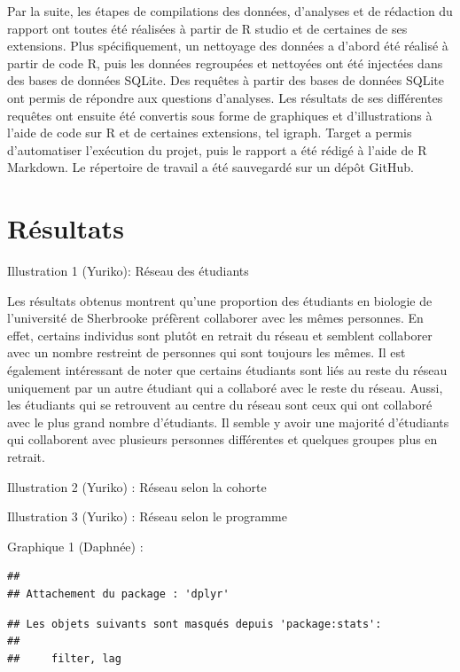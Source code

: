 \documentclass[9pt,twocolumn,twoside,]{pnas-new}
\begin{document}
Par la suite, les étapes de compilations des données, d'analyses et de
rédaction du rapport ont toutes été réalisées à partir de R studio et de
certaines de ses extensions. Plus spécifiquement, un nettoyage des
données a d'abord été réalisé à partir de code R, puis les données
regroupées et nettoyées ont été injectées dans des bases de données
SQLite. Des requêtes à partir des bases de données SQLite ont permis de
répondre aux questions d'analyses. Les résultats de ses différentes
requêtes ont ensuite été convertis sous forme de graphiques et
d'illustrations à l'aide de code sur R et de certaines extensions, tel
igraph. Target a permis d'automatiser l'exécution du projet, puis le
rapport a été rédigé à l'aide de R Markdown. Le répertoire de travail a
été sauvegardé sur un dépôt GitHub.

\hypertarget{ruxe9sultats}{%
\section{Résultats}\label{ruxe9sultats}}

Illustration 1 (Yuriko): Réseau des étudiants

Les résultats obtenus montrent qu'une proportion des étudiants en
biologie de l'université de Sherbrooke préfèrent collaborer avec les
mêmes personnes. En effet, certains individus sont plutôt en retrait du
réseau et semblent collaborer avec un nombre restreint de personnes qui
sont toujours les mêmes. Il est également intéressant de noter que
certains étudiants sont liés au reste du réseau uniquement par un autre
étudiant qui a collaboré avec le reste du réseau. Aussi, les étudiants
qui se retrouvent au centre du réseau sont ceux qui ont collaboré avec
le plus grand nombre d'étudiants. Il semble y avoir une majorité
d'étudiants qui collaborent avec plusieurs personnes différentes et
quelques groupes plus en retrait.

Illustration 2 (Yuriko) : Réseau selon la cohorte

Illustration 3 (Yuriko) : Réseau selon le programme

Graphique 1 (Daphnée) :

\begin{verbatim}
## 
## Attachement du package : 'dplyr'
\end{verbatim}

\begin{verbatim}
## Les objets suivants sont masqués depuis 'package:stats':
## 
##     filter, lag
\end{verbatim}
\end{document}
